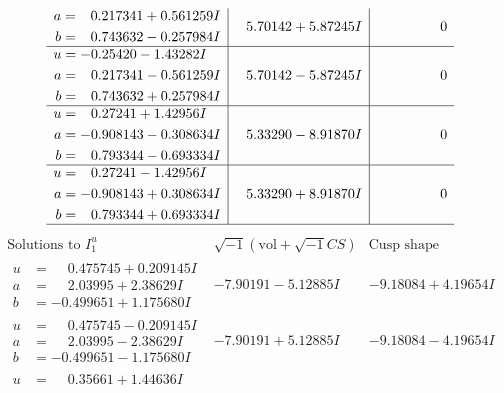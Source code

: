 \documentclass[1p]{elsarticle_modified}
\theoremstyle{definition}
\newcommand{\I}{\sqrt{-1}}
\begin{document}
$$\begin{array}{c|c|c}
\begin{aligned}
a &= \phantom{-}0.217341 + 0.561259 I \\
b &= \phantom{-}0.743632 - 0.257984 I\end{aligned}
 & \phantom{-}5.70142 + 5.87245 I & \phantom{-0.000000 } 0 \\ \hline\begin{aligned}
u &= -0.25420 - 1.43282 I \\
a &= \phantom{-}0.217341 - 0.561259 I \\
b &= \phantom{-}0.743632 + 0.257984 I\end{aligned}
 & \phantom{-}5.70142 - 5.87245 I & \phantom{-0.000000 } 0 \\ \hline\begin{aligned}
u &= \phantom{-}0.27241 + 1.42956 I \\
a &= -0.908143 - 0.308634 I \\
b &= \phantom{-}0.793344 - 0.693334 I\end{aligned}
 & \phantom{-}5.33290 - 8.91870 I & \phantom{-0.000000 } 0 \\ \hline\begin{aligned}
u &= \phantom{-}0.27241 - 1.42956 I \\
a &= -0.908143 + 0.308634 I \\
b &= \phantom{-}0.793344 + 0.693334 I\end{aligned}
 & \phantom{-}5.33290 + 8.91870 I & \phantom{-0.000000 } 0\\
 \hline 
 \end{array}$$\newpage$$\begin{array}{c|c|c}  
\text{Solutions to }I^u_{1}& \I (\text{vol} + \sqrt{-1}CS) & \text{Cusp shape}\\
 \hline 
\begin{aligned}
u &= \phantom{-}0.475745 + 0.209145 I \\
a &= \phantom{-}2.03995 + 2.38629 I \\
b &= -0.499651 + 1.175680 I\end{aligned}
 & -7.90191 - 5.12885 I & -9.18084 + 4.19654 I \\ \hline\begin{aligned}
u &= \phantom{-}0.475745 - 0.209145 I \\
a &= \phantom{-}2.03995 - 2.38629 I \\
b &= -0.499651 - 1.175680 I\end{aligned}
 & -7.90191 + 5.12885 I & -9.18084 - 4.19654 I \\ \hline\begin{aligned}
u &= \phantom{-}0.35661 + 1.44636 I \\

\end{aligned}
\end{array}$$
\end{document}
